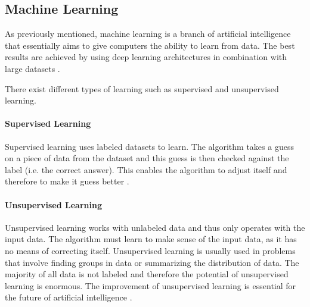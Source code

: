 \subsection{Machine Learning}
\label{subsec:ml}

As previously mentioned, machine learning is a branch of artificial intelligence that essentially aims to give computers the ability to learn from data.
The best results are achieved by using deep learning architectures in combination with large datasets \cite{ai_machine_learning}.

There exist different types of learning such as supervised and unsupervised learning.

\paragraph{Supervised Learning}
Supervised learning uses labeled datasets to learn.
The algorithm takes a guess on a piece of data from the dataset and this guess is then checked against the label (i.e. the correct answer).
This enables the algorithm to adjust itself and therefore to make it guess better \cite{supervised_learning}.

\paragraph{Unsupervised Learning}
Unsupervised learning works with unlabeled data and thus only operates with the input data.
The algorithm must learn to make sense of the input data, as it has no means of correcting itself.
Unsupervised learning is usually used in problems that involve finding groups in data or summarizing the distribution of data.
The majority of all data is not labeled and therefore the potential of unsupervised learning is enormous.
The improvement of unsupervised learning is essential for the future of artificial intelligence \cite{unsupervised_learning}.
